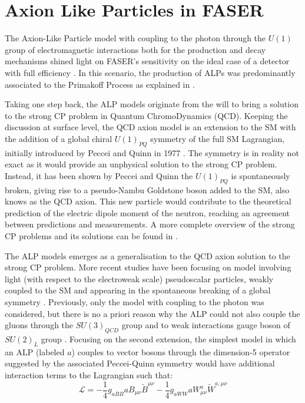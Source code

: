 	
		
	\clearpage
	\section{Axion Like Particles in FASER}
		The Axion-Like Particle model with coupling to the photon through the $U(1)$ group of electromagnetic interactions both for the production and decay mechanisms shined light on FASER's sensitivity on the ideal case of a detector with full efficiency . In this scenario, the production of ALPs was predominantly associated to the Primakoff Process as explained in .
		
		Taking one step back, the ALP models originate from the will to bring a solution to the strong CP problem in Quantum ChromoDynamics (QCD). Keeping the discussion at surface level, the QCD axion model is an extension to the SM with the addition of a global chiral $U(1)_{PQ}$ symmetry of the full SM Lagrangian, initially introduced by Peccei and Quinn in 1977 \cite{QCD_axion_PecceiQuinn}. The symmetry is in reality not exact as it would provide an unphysical solution to the strong CP problem. Instead, it has been shown by Peccei and Quinn the $U(1)_{PQ}$ is spontaneously broken, giving rise to a pseudo-Nambu Goldstone boson added to the SM, also knows as the QCD axion. This new particle would contribute to the theoretical prediction of the electric dipole moment of the neutron, reaching an agreement between predictions and measurements. A more complete overview of the strong CP problems and its solutions can be found in \cite{Moretti_MasterThesis}.
		
		The ALP models emerges as a generalisation to the QCD axion solution to the strong CP problem. More recent studies have been focusing on model involving light (with respect to the electroweak scale) pseudoscalar particles, weakly coupled to the SM and appearing in the spontaneous breaking of a global symmetry \cite{ALPs_general}. Previously, only the model with coupling to the photon was considered, but there is no a priori reason why the ALP could not also couple the gluons through the $SU(3)_{QCD}$ group and to weak interactions gauge boson of $SU(2)_L$ group \cite{Moretti_MasterThesis}. Focusing on the second extension, the simplest model in which an ALP (labeled $a$) couples to vector bosons through the dimension-5 operator suggested by the associated Peccei-Quinn symmetry would have additional interaction terms to the Lagrangian such that: 
		\begin{equation}
			\mathcal{L} = -\frac{1}{4} g_{aBB} a B_{\mu\nu} \tilde{B}^{\mu\nu} - \frac{1}{4} g_{aWW} a W_{\mu\nu}^a \tilde{W}^{a,\mu\nu}
		\end{equation} 
		
